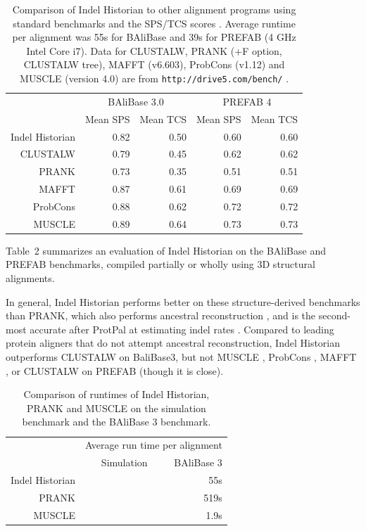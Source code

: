 \documentclass{bioinfo}
\begin{document}
\begin{table}
  \begin{tabular}{r|rr|rr}
    & \multicolumn{2}{c|}{BAliBase 3.0} & \multicolumn{2}{c}{PREFAB 4} \\
    & Mean SPS & Mean TCS & Mean SPS & Mean TCS \\
    \hline
Indel Historian & 0.82 & 0.50 & 0.60 & 0.60 \\
CLUSTALW & 0.79 & 0.45 & 0.62 & 0.62 \\
PRANK & 0.73 & 0.35 & 0.51 & 0.51 \\
MAFFT & 0.87 & 0.61 & 0.69 & 0.69 \\
ProbCons & 0.88 & 0.62 & 0.72 & 0.72 \\
MUSCLE & 0.89 & 0.64 & 0.73 & 0.73
  \end{tabular}
  \caption{
    Comparison of Indel Historian to other alignment programs using standard benchmarks
    and the SPS/TCS scores \citep{ThompsonEtAl2005}.
    Average runtime per alignment was 55s for BAliBase and 39s for PREFAB (4 GHz Intel Core i7).
    Data for CLUSTALW, PRANK (+F option, CLUSTALW tree), MAFFT (v6.603), ProbCons (v1.12) and MUSCLE (version 4.0) are from {\tt http://drive5.com/bench/} \citep{Edgar2010}.
  }
\end{table}

Table~2 summarizes an evaluation of Indel Historian
on the BAliBase and PREFAB benchmarks,
compiled partially or wholly using 3D structural alignments.

In general, Indel Historian performs better on these structure-derived benchmarks than PRANK,
which also performs ancestral reconstruction \citep{LoytynojaGoldman2008},
and is the second-most accurate after ProtPal at estimating indel rates \citep{Westesson2012-zg}.
Compared to leading protein aligners that do not attempt ancestral reconstruction,
Indel Historian outperforms CLUSTALW \citep{LarkinEtAl2007} on BaliBase3, but not MUSCLE \citep{Edgar2004b},
ProbCons \citep{DoEtAl2005}, MAFFT \citep{KatohEtAl2005}, or CLUSTALW on PREFAB (though it is close).

\begin{table}
  \begin{tabular}{r|rr}
    & \multicolumn{2}{c}{Average run time per alignment} \\
 & Simulation & BAliBase 3 \\
    \hline
Indel Historian & & 55s \\
PRANK & & 519s \\
MUSCLE & & 1.9s \\
\end{tabular}
\caption{
    Comparison of runtimes of Indel Historian, PRANK and MUSCLE on the simulation benchmark and the BAliBase 3 benchmark.
  }
\end{table}
\end{document}
